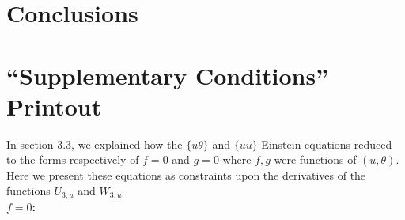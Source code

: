\documentclass[a4paper,11pt]{article}
\numberwithin{equation}{section}
\begin{document}
\section{Conclusions}

\appendix

\section{``Supplementary Conditions'' Printout}

In section 3.3, we explained how the $\{u \theta\}$ and $\{u u \}$ Einstein equations reduced to the forms respectively of $f=0$ and $g=0$ where $f,g$ were functions of $(u, \theta)$. Here we present these equations as constraints upon the derivatives of the functions $U_{3, u}$ and $W_{3, u}$ \\


\textbf{$f=0$:}
\end{document}
